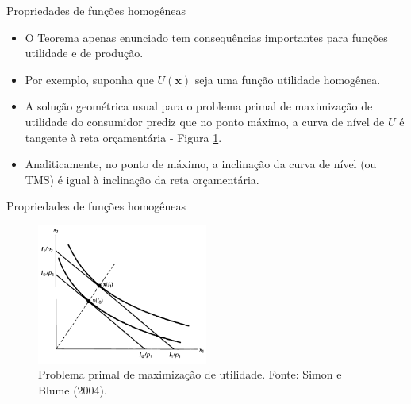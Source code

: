 \documentclass[10pt]{beamer}
\begin{document}
\begin{frame}{Propriedades de funções homogêneas}
    \begin{itemize}
        \item O Teorema apenas enunciado tem consequências importantes para funções utilidade e de produção.
        \bigskip
        \item Por exemplo, suponha que $U(\mathbf{x})$ seja uma função utilidade homogênea.
        \bigskip
        \item A solução geométrica usual para o problema primal de maximização de utilidade do consumidor prediz que no ponto máximo, a curva de nível de $U$ é tangente à reta orçamentária - Figura \ref{fig6}.
        \bigskip
        \item Analiticamente, no ponto de máximo, a inclinação da curva de nível (ou TMS) é igual à inclinação da reta orçamentária.
    \end{itemize}
\end{frame}

\begin{frame}{Propriedades de funções homogêneas}
    \begin{figure}
        \centering
        \includegraphics[width=0.5\textwidth]{./figures/aula14_fig5.PNG}
        \caption{Problema primal de maximização de utilidade. Fonte: Simon e Blume (2004).}
        \label{fig6}
    \end{figure}
\end{frame}
\end{document}
